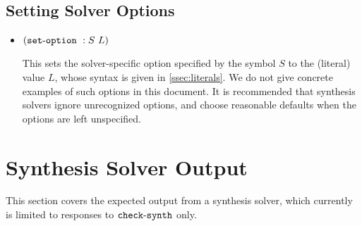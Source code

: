 \documentclass[english,a4paper,10pt]{article}
\begin{document}
\subsection{Setting Solver Options}

\begin{itemize}
\item ${\tt (}{\tt set\mbox{-}option}\mbox{ }:S\mbox{ }L{\tt )}$

This sets the solver-specific option specified by the symbol $S$ 
to the (literal) value $L$, whose syntax is given in \cref{ssec:literals}.
We do not give concrete examples of such options in this document. %
It is recommended that synthesis solvers
ignore unrecognized options, 
and choose reasonable defaults when the
options are left unspecified.
\end{itemize}

\section{Synthesis Solver Output}
\label{sec:output}

This section covers the expected output from a synthesis solver,
which currently is limited to responses to ${\tt check\mbox{-}synth}$ 
only.
\end{document}
